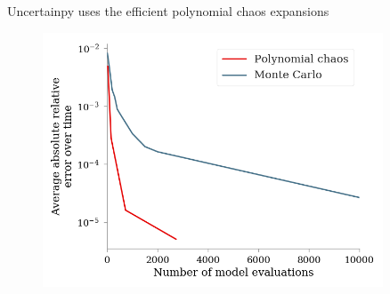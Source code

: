 \documentclass[presentation]{beamer}
\begin{document}
\begin{frame}

\end{frame}




\begin{frame}{Uncertainpy uses the efficient polynomial chaos expansions}
  \begin{figure}
     \includegraphics[width=0.9\textwidth]{mc_vs_pc.png}
  \end{figure}

  \end{frame}
\end{document}

